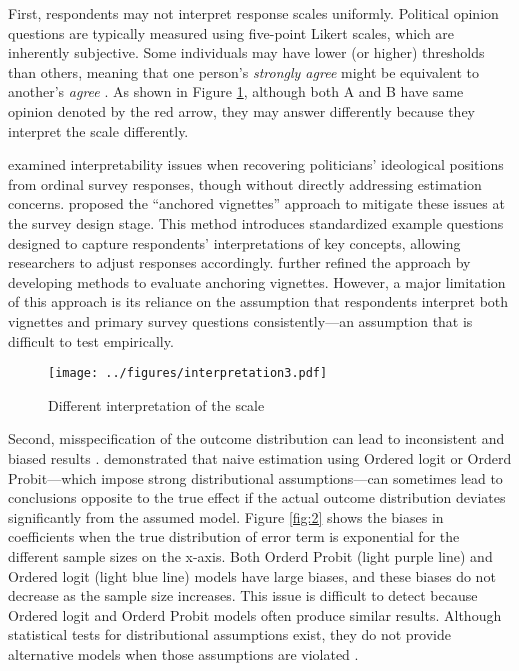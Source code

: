 \documentclass{article}
\begin{document}
First, respondents may not interpret response scales uniformly. Political opinion questions are typically measured using five-point Likert scales, which are inherently subjective. Some individuals may have lower (or higher) thresholds than others, meaning that one person’s \textit{strongly agree} might be equivalent to another’s \textit{agree} \citet{King2004a}. As shown in Figure \ref{fig:1}, although both A and B have same opinion denoted by the red arrow, they may answer differently because they interpret the scale differently.

\citet{Aldrich1977a} examined interpretability issues when recovering politicians’ ideological positions from ordinal survey responses, though without directly addressing estimation concerns. \citet{King2004a} proposed the “anchored vignettes” approach to mitigate these issues at the survey design stage. This method introduces standardized example questions designed to capture respondents’ interpretations of key concepts, allowing researchers to adjust responses accordingly. \citet{King2007a} further refined the approach by developing methods to evaluate anchoring vignettes. However, a major limitation of this approach is its reliance on the assumption that respondents interpret both vignettes and primary survey questions consistently—an assumption that is difficult to test empirically.

\begin{figure}
    \begin{center}
        \texttt{[image: ../figures/interpretation3.pdf]}
    \end{center}
    \caption{Different interpretation of the scale}\label{fig:1}
\end{figure}


Second, misspecification of the outcome distribution can lead to inconsistent and biased results \citep{Manski1988a, Greene2010a, Bond2018a}. \citet{Bond2018a} demonstrated that naive estimation using Ordered logit or Orderd Probit—which impose strong distributional assumptions—can sometimes lead to conclusions opposite to the true effect if the actual outcome distribution deviates significantly from the assumed model. Figure \ref{fig:2} shows the biases in coefficients when the true distribution of error term is exponential for the different sample sizes on the x-axis. Both Orderd Probit (light purple line) and Ordered logit (light blue line) models have large biases, and these biases do not decrease as the sample size increases. This issue is difficult to detect because Ordered logit and Orderd Probit models often produce similar results. Although statistical tests for distributional assumptions exist, they do not provide alternative models when those assumptions are violated \citep{Bera1982a, Glewwe1997a, Weiss1997a}.
\end{document}
